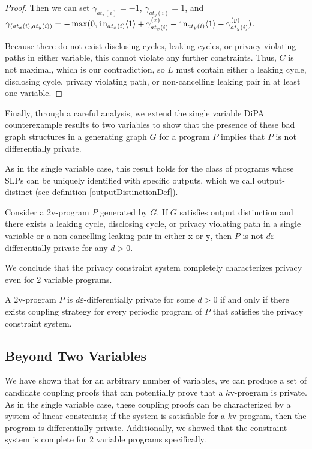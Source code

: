 \begin{proof}
    Then we can set $\gamma_{at_x(i)} = -1$, $\gamma_{at_y(i)}=1$, and $\gamma_{(at_x(i), at_y(i))} =  -\max(0, \texttt{in}_{at_x(i)}\langle1 \rangle+ \gamma_{at_x(i)}^{(x)}-\texttt{in}_{at_y(i)}\langle1 \rangle-\gamma_{at_y(i)}^{(y)})$. 
    
    Because there do not exist disclosing cycles, leaking cycles, or privacy violating paths in either variable, this cannot violate any further constraints. Thus, $C$ is not maximal, which is our contradiction, so $L$ must contain either a leaking cycle, disclosing cycle, privacy violating path, or non-cancelling leaking pair in at least one variable.
\end{proof}

Finally, through a careful analysis, we extend the single variable DiPA counterexample results to two variables to show that the presence of these bad graph structures in a generating graph $G$ for a program $P$ implies that $P$ is not differentially private. 

As in the single variable case, this result holds for the class of programs whose SLPs can be uniquely identified with specific outputs, which we call output-distinct (see definition \ref{outputDistinctionDef}).


\begin{lemma}\label{mvNotwellformedImpliesNotPrivate}
    Consider a 2v-program $P$ generated by $G$. If $G$ satisfies output distinction and there exists a leaking cycle, disclosing cycle, or privacy violating path in a single variable or a non-cancelling leaking pair in either $\texttt{x}$ or $\texttt{y}$, then $P$ is not $d\varepsilon$-differentially private for any $d>0$. 
\end{lemma}

We conclude that the privacy constraint system completely characterizes privacy even for 2 variable programs.

\begin{thm}\label{2vCompletenessTheorem}
    A 2v-program $P$ is $d\varepsilon$-differentially private for some $d>0$ if and only if there exists coupling strategy for every periodic program of $P$ that satisfies the privacy constraint system.
\end{thm}

\subsection{Beyond Two Variables}\label{generalizingToKVariables}

We have shown that for an arbitrary number of variables, we can produce a set of candidate coupling proofs that can potentially prove that a $k$v-program is private. As in the single variable case, these coupling proofs can be characterized by a system of linear constraints; if the system is satisfiable for a $k$v-program, then the program is differentially private. Additionally, we showed that the constraint system is complete for 2 variable programs specifically. 

